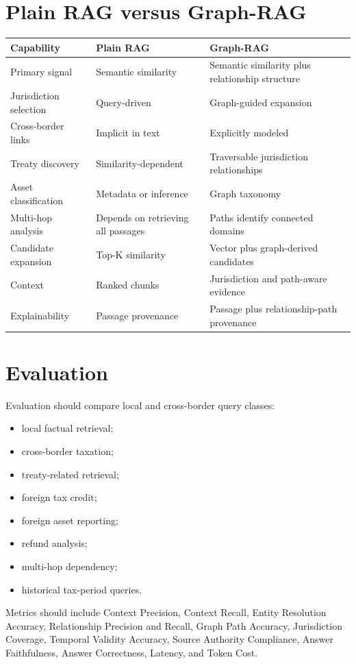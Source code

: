 \documentclass[11pt,a4paper]{article}
\begin{document}
\section{Plain RAG versus Graph-RAG}
\begin{longtable}{p{3.2cm}p{5.5cm}p{5.5cm}}\toprule
Capability & Plain RAG & Graph-RAG\\\midrule
\endhead
Primary signal & Semantic similarity & Semantic similarity plus relationship structure\\
Jurisdiction selection & Query-driven & Graph-guided expansion\\
Cross-border links & Implicit in text & Explicitly modeled\\
Treaty discovery & Similarity-dependent & Traversable jurisdiction relationships\\
Asset classification & Metadata or inference & Graph taxonomy\\
Multi-hop analysis & Depends on retrieving all passages & Paths identify connected domains\\
Candidate expansion & Top-K similarity & Vector plus graph-derived candidates\\
Context & Ranked chunks & Jurisdiction and path-aware evidence\\
Explainability & Passage provenance & Passage plus relationship-path provenance\\
\bottomrule
\end{longtable}

\section{Evaluation}
Evaluation should compare local and cross-border query classes:
\begin{itemize}
\item local factual retrieval;
\item cross-border taxation;
\item treaty-related retrieval;
\item foreign tax credit;
\item foreign asset reporting;
\item refund analysis;
\item multi-hop dependency;
\item historical tax-period queries.
\end{itemize}
Metrics should include Context Precision, Context Recall, Entity Resolution Accuracy, Relationship Precision and Recall, Graph Path Accuracy, Jurisdiction Coverage, Temporal Validity Accuracy, Source Authority Compliance, Answer Faithfulness, Answer Correctness, Latency, and Token Cost.
\end{document}
